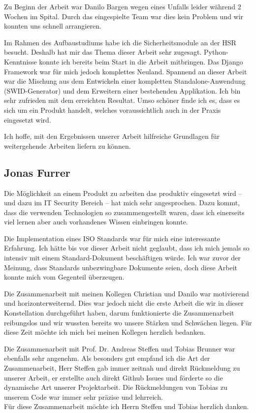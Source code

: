 Zu Beginn der Arbeit war Danilo Bargen wegen eines Unfalls leider während 2
Wochen im Spital. Durch das eingespielte Team war dies kein Problem und wir
konnten uns schnell arrangieren.

Im Rahmen des Aufbaustudiums habe ich die Sicherheitsmodule an der HSR besucht.
Deshalb hat mir das Thema dieser Arbeit sehr zugesagt. Python-Kenntnisse konnte
ich bereits beim Start in die Arbeit mitbringen. Das Django Framework war für
mich jedoch komplettes Neuland. Spannend an dieser Arbeit war die Mischung aus
dem Entwickeln einer kompletten Standalone-Anwendung (SWID-Generator) und dem
Erweitern einer bestehenden Applikation. Ich bin sehr zufrieden mit dem
erreichten Resultat. Umso schöner finde ich es, dass es sich um ein Produkt
handelt, welches voraussichtlich auch in der Praxis eingesetzt wird.

Ich hoffe, mit den Ergebnissen unserer Arbeit hilfreiche Grundlagen für
weitergehende Arbeiten liefern zu können.


\subsection{Jonas Furrer} 
Die Möglichkeit an einem Produkt zu arbeiten das produktiv eingesetzt wird --
und dazu im IT Security Bereich -- hat mich sehr angesprochen. Dazu kommt, dass
die verwenden Technologien so zusammengestellt waren, dass ich einerseits viel
lernen aber auch vorhandenes Wissen einbringen konnte.

Die Implementation eines ISO Standards war für mich eine interessante Erfahrung.
Ich hätte bis vor dieser Arbeit nicht geglaubt, dass ich mich jemals so intensiv
mit einem Standard-Dokument beschäftigen würde. Ich war zuvor der Meinung, dass
Standards unbezwingbare Dokumente seien, doch diese Arbeit konnte mich vom
Gegenteil überzeugen.

Die Zusammenarbeit mit meinen Kollegen Christian und Danilo war motivierend und
hori\-zont\-erweiternd. Dies war jedoch nicht die erste Arbeit die wir in dieser
Konstellation durchgeführt haben, darum funktionierte die Zusammenarbeit
reibungslos und wir wussten bereits wo unsere Stärken und Schwächen liegen. Für
diese Zeit möchte ich mich bei meinen Kollegen herzlich bedanken.

Die Zusammenarbeit mit Prof. Dr. Andreas Steffen und Tobias Brunner war
ebenfalls sehr angenehm. Als besonders gut empfand ich die Art der
Zusammenarbeit, Herr Steffen gab immer zeitnah und direkt Rückmeldung zu unserer
Arbeit, er erstellte auch direkt Github Issues und förderte so die dynamische
Art unserer Projektarbeit. Die Rückmeldungen von Tobias zu unserem Code war
immer sehr präzise und lehrreich. \\ Für diese Zusammenarbeit möchte ich Herrn
Steffen und Tobias herzlich danken.
